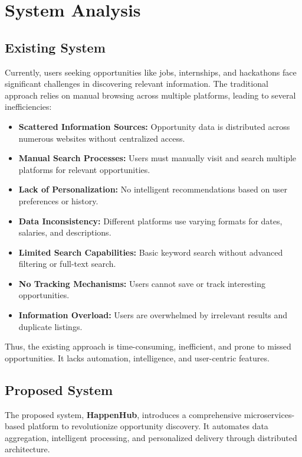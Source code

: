 \documentclass[12pt,a4paper]{report}
\begin{document}
\chapter{System Analysis}

\section{Existing System}

Currently, users seeking opportunities like jobs, internships, and hackathons
face significant challenges in discovering relevant information. The
traditional approach relies on manual browsing across multiple platforms,
leading to several inefficiencies:

\begin{itemize}
    \item \textbf{Scattered Information Sources:} Opportunity data is distributed across numerous websites without centralized access.
    \item \textbf{Manual Search Processes:} Users must manually visit and search multiple platforms for relevant opportunities.
    \item \textbf{Lack of Personalization:} No intelligent recommendations based on user preferences or history.
    \item \textbf{Data Inconsistency:} Different platforms use varying formats for dates, salaries, and descriptions.
    \item \textbf{Limited Search Capabilities:} Basic keyword search without advanced filtering or full-text search.
    \item \textbf{No Tracking Mechanisms:} Users cannot save or track interesting opportunities.
    \item \textbf{Information Overload:} Users are overwhelmed by irrelevant results and duplicate listings.
\end{itemize}

Thus, the existing approach is time-consuming, inefficient, and prone to missed
opportunities. It lacks automation, intelligence, and user-centric features.

\section{Proposed System}

The proposed system, \textbf{HappenHub}, introduces a comprehensive
microservices-based platform to revolutionize opportunity discovery. It
automates data aggregation, intelligent processing, and personalized delivery
through distributed architecture.
\end{document}
